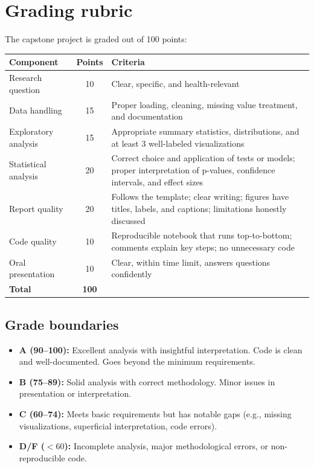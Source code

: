 \section{Grading rubric}

The capstone project is graded out of 100 points:

\begin{center}
\begin{tabular}{lcp{8cm}}
\toprule
\textbf{Component} & \textbf{Points} & \textbf{Criteria} \\
\midrule
Research question & 10 & Clear, specific, and health-relevant \\
Data handling & 15 & Proper loading, cleaning, missing value treatment, and documentation \\
Exploratory analysis & 15 & Appropriate summary statistics, distributions, and at least 3 well-labeled visualizations \\
Statistical analysis & 20 & Correct choice and application of tests or models; proper interpretation of p-values, confidence intervals, and effect sizes \\
Report quality & 20 & Follows the template; clear writing; figures have titles, labels, and captions; limitations honestly discussed \\
Code quality & 10 & Reproducible notebook that runs top-to-bottom; comments explain key steps; no unnecessary code \\
Oral presentation & 10 & Clear, within time limit, answers questions confidently \\
\midrule
\textbf{Total} & \textbf{100} & \\
\bottomrule
\end{tabular}
\end{center}

\subsection{Grade boundaries}

\begin{itemize}
  \item \textbf{A (90--100):} Excellent analysis with insightful interpretation. Code is clean and well-documented. Goes beyond the minimum requirements.
  \item \textbf{B (75--89):} Solid analysis with correct methodology. Minor issues in presentation or interpretation.
  \item \textbf{C (60--74):} Meets basic requirements but has notable gaps (e.g., missing visualizations, superficial interpretation, code errors).
  \item \textbf{D/F ($<60$):} Incomplete analysis, major methodological errors, or non-reproducible code.
\end{itemize}

